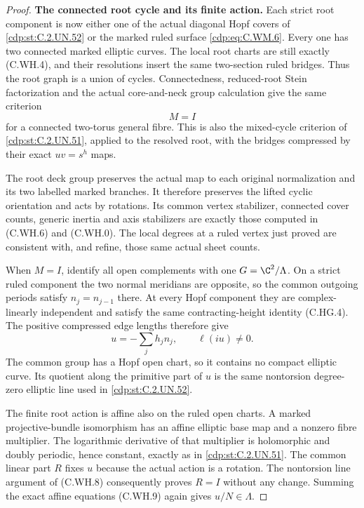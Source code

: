 \begin{proof}
\par\medskip\noindent\textbf{The connected root cycle and its finite action.}
Each strict root component is now either
one of the actual diagonal Hopf covers of
\ref{cdp:st:C.2.UN.52} or the marked ruled surface \eqref{cdp:eq:C.WM.6}.
Every one has two connected marked elliptic
curves. The local root charts are still
exactly (C.WH.4), and their resolutions
insert the same two-section ruled bridges.
Thus the root graph is a union of cycles.
Connectedness, reduced-root Stein factorization
and the actual core-and-neck group calculation
give the same criterion
\[
                         M=I
\tag{C.WM.8}\label{cdp:eq:C.WM.8}
\]
for a connected two-torus general fibre.
This is also the mixed-cycle criterion
of \ref{cdp:st:C.2.UN.51}, applied to the resolved root,
with the bridges compressed by their
exact $uv=s^h$ maps.

The root deck group preserves the actual
map to each original normalization and
its two labelled marked branches. It
therefore preserves the lifted cyclic
orientation and acts by rotations.
Its common vertex stabilizer, connected
cover counts, generic inertia and axis
stabilizers are exactly those computed
in (C.WH.6) and (C.WH.0). The local
degrees at a ruled vertex just proved
are consistent with, and refine, those
same actual sheet counts.

When $M=I$, identify all open complements
with one $G=\C^2/\Lambda$.
On a strict ruled component the two
normal meridians are opposite, so
the common outgoing periods satisfy
$n_j=n_{j-1}$ there. At every Hopf
component they are complex-linearly
independent and satisfy the same
contracting-height identity (C.HG.4).
The positive compressed edge lengths
therefore give
\[
                  u=-\sum_j h_j n_j,\qquad \ell(iu)\ne0.
\tag{C.WM.9}\label{cdp:eq:C.WM.9}
\]
The common group has a Hopf open chart,
so it contains no compact elliptic curve.
Its quotient along the primitive part
of $u$ is the same nontorsion degree-zero
elliptic line used in \ref{cdp:st:C.2.UN.52}.

The finite root action is affine also
on the ruled open charts. A marked
projective-bundle isomorphism has an
affine elliptic base map and a
nonzero fibre multiplier. The logarithmic
derivative of that multiplier is
holomorphic and doubly periodic,
hence constant, exactly as in \ref{cdp:st:C.2.UN.51}.
The common linear part $R$ fixes $u$
because the actual action is a
rotation. The nontorsion line argument
of (C.WH.8) consequently proves
$R=I$ without any change.
Summing the exact affine equations
(C.WH.9) again gives
$u/N\in\Lambda$.


\end{proof}
